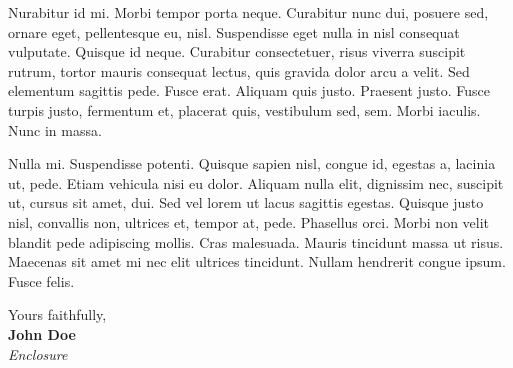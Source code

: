 \documentclass[11pt]{article}
\begin{document}
Nurabitur id mi. Morbi tempor porta neque. Curabitur nunc dui, posuere sed, ornare eget, pellentesque eu, nisl. Suspendisse eget nulla in nisl consequat vulputate. Quisque id neque. Curabitur consectetuer, risus viverra suscipit rutrum, tortor mauris consequat lectus, quis gravida dolor arcu a velit. Sed elementum sagittis pede. Fusce erat. Aliquam quis justo. Praesent justo. Fusce turpis justo, fermentum et, placerat quis, vestibulum sed, sem. Morbi iaculis. Nunc in massa.

Nulla mi. Suspendisse potenti. Quisque sapien nisl, congue id, egestas a, lacinia ut, pede. Etiam vehicula nisi eu dolor. Aliquam nulla elit, dignissim nec, suscipit ut, cursus sit amet, dui. Sed vel lorem ut lacus sagittis egestas. Quisque justo nisl, convallis non, ultrices et, tempor at, pede. Phasellus orci. Morbi non velit blandit pede adipiscing mollis. Cras malesuada. Mauris tincidunt massa ut risus. Maecenas sit amet mi nec elit ultrices tincidunt. Nullam hendrerit congue ipsum. Fusce felis.
  
Yours faithfully,\\[2em] %
%
{\bfseries John Doe}\\
%
\vfill%
{\slshape Enclosure}
\end{document}
